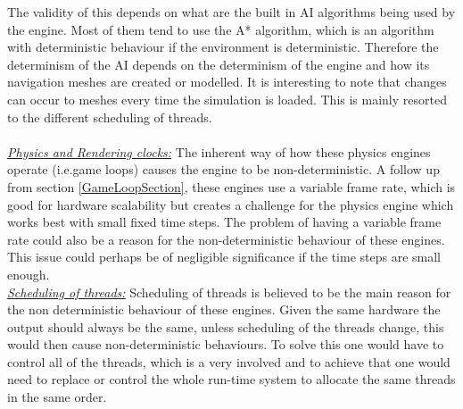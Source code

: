 The validity of this depends on what are the built in AI algorithms being used by the engine. 
Most of them tend to use the A* algorithm\cite{AStarBook}, which is an algorithm with deterministic behaviour if the environment is deterministic\cite{AirsimUnrealArticle}\cite{UnrealAIDocumentation}. 
Therefore the determinism of the AI depends on the determinism of the engine and how its navigation meshes are created or modelled. It is interesting to note that changes can occur to meshes every time the simulation is loaded. This is mainly resorted to the different scheduling of threads. \\\\
\noindent\underline{\textit{Physics and Rendering clocks:}}
The inherent way of how these physics engines operate (i.e.game loops) causes the engine to be non-deterministic. 
A follow up from section \ref{GameLoopSection}, these engines use a variable frame rate, which is good for hardware scalability but creates a challenge for the physics engine which works best with small fixed time steps. 
The problem of having a variable frame rate could also be a reason for the non-deterministic behaviour of these engines. This issue could perhaps be of negligible significance if the time steps are small enough. \\

\noindent\underline{\textit{Scheduling of threads:}} Scheduling of threads is believed to be the main reason for the non deterministic behaviour of these engines. Given the same hardware the output should always be the same, unless scheduling of the threads change, this would then cause non-deterministic behaviours. To solve this one would have to control all of the threads, which is a very involved and to achieve that one would need to replace or control the whole run-time system to allocate the same threads in the same order.

